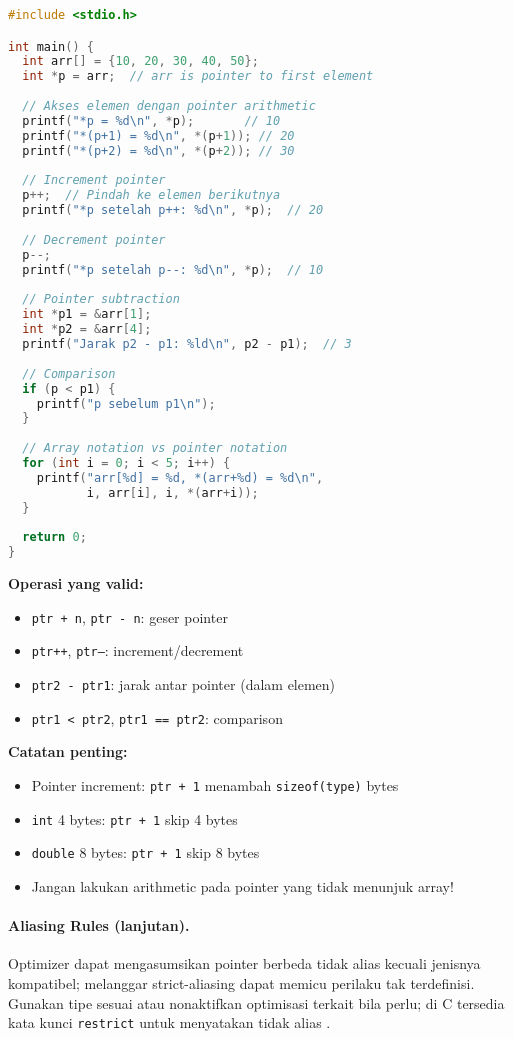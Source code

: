 \documentclass[../main.tex]{subfiles}
\begin{document}
\begin{lstlisting}[language=C, caption={Pointer arithmetic di C}]
#include <stdio.h>

int main() {
  int arr[] = {10, 20, 30, 40, 50};
  int *p = arr;  // arr is pointer to first element
  
  // Akses elemen dengan pointer arithmetic
  printf("*p = %d\n", *p);       // 10
  printf("*(p+1) = %d\n", *(p+1)); // 20
  printf("*(p+2) = %d\n", *(p+2)); // 30
  
  // Increment pointer
  p++;  // Pindah ke elemen berikutnya
  printf("*p setelah p++: %d\n", *p);  // 20
  
  // Decrement pointer
  p--;
  printf("*p setelah p--: %d\n", *p);  // 10
  
  // Pointer subtraction
  int *p1 = &arr[1];
  int *p2 = &arr[4];
  printf("Jarak p2 - p1: %ld\n", p2 - p1);  // 3
  
  // Comparison
  if (p < p1) {
    printf("p sebelum p1\n");
  }
  
  // Array notation vs pointer notation
  for (int i = 0; i < 5; i++) {
    printf("arr[%d] = %d, *(arr+%d) = %d\n", 
           i, arr[i], i, *(arr+i));
  }
  
  return 0;
}
\end{lstlisting}

\textbf{Operasi yang valid:}
\begin{itemize}
  \item \texttt{ptr + n}, \texttt{ptr - n}: geser pointer
  \item \texttt{ptr++}, \texttt{ptr--}: increment/decrement
  \item \texttt{ptr2 - ptr1}: jarak antar pointer (dalam elemen)
  \item \texttt{ptr1 < ptr2}, \texttt{ptr1 == ptr2}: comparison
\end{itemize}

\textbf{Catatan penting:}
\begin{itemize}
  \item Pointer increment: \texttt{ptr + 1} menambah \texttt{sizeof(type)} bytes
  \item \texttt{int} 4 bytes: \texttt{ptr + 1} skip 4 bytes
  \item \texttt{double} 8 bytes: \texttt{ptr + 1} skip 8 bytes
  \item Jangan lakukan arithmetic pada pointer yang tidak menunjuk array!
\end{itemize}

\paragraph{Aliasing Rules (lanjutan).} Optimizer dapat mengasumsikan pointer berbeda tidak alias kecuali jenisnya kompatibel; melanggar strict-aliasing dapat memicu perilaku tak terdefinisi. Gunakan tipe sesuai atau nonaktifkan optimisasi terkait bila perlu; di C tersedia kata kunci \texttt{restrict} untuk menyatakan tidak alias \parencite{gcc-strict-aliasing,c-restrict}.
\end{document}
